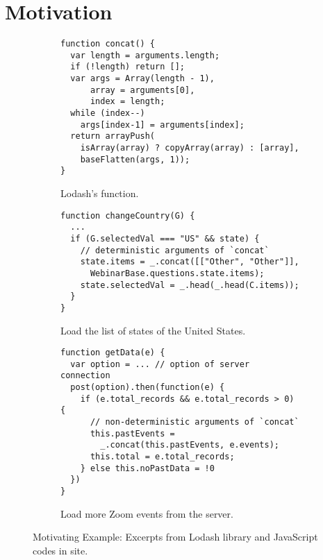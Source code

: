 \section{Motivation}\label{sec:motivation}

\begin{figure}[t]
  \centering
  \begin{subfigure}[t]{0.5\textwidth}
    \begin{lstlisting}[style=myJSstyle]
function concat() {
  var length = arguments.length;
  if (!length) return [];
  var args = Array(length - 1),
      array = arguments[0],
      index = length;
  while (index--)
    args[index-1] = arguments[index];
  return arrayPush(
    isArray(array) ? copyArray(array) : [array],
    baseFlatten(args, 1));
}
    \end{lstlisting}
    \vspace*{-1em}
    \caption{Lodash's  function.}
    \label{fig:concat}
  \end{subfigure}
  \begin{subfigure}[t]{0.5\textwidth}
    \begin{lstlisting}[style=myJSstyle,firstnumber=13]
function changeCountry(G) {
  ...
  if (G.selectedVal === "US" && state) {
    // deterministic arguments of `concat`
    state.items = _.concat([["Other", "Other"]],
      WebinarBase.questions.state.items);
    state.selectedVal = _.head(_.head(C.items));
  }
}
    \end{lstlisting}
    \vspace*{-1em}
    \caption{Load the list of states of the United States.}
    \label{fig:changeCountry}
  \end{subfigure}
  \begin{subfigure}[t]{0.5\textwidth}
    \begin{lstlisting}[style=myJSstyle,firstnumber=22]
function getData(e) {
  var option = ... // option of server connection
  post(option).then(function(e) {
    if (e.total_records && e.total_records > 0) {
      // non-deterministic arguments of `concat`
      this.pastEvents =
        _.concat(this.pastEvents, e.events);
      this.total = e.total_records;
    } else this.noPastData = !0
  })
}
    \end{lstlisting}
    \vspace*{-1em}
    \caption{Load more Zoom events from the server.}
    \label{fig:getData}
  \end{subfigure}
  \vspace*{-1em}
  \caption{Motivating Example: Excerpts from Lodash library and JavaScript codes
  \label{fig:example}
  in  site.}
\end{figure}

